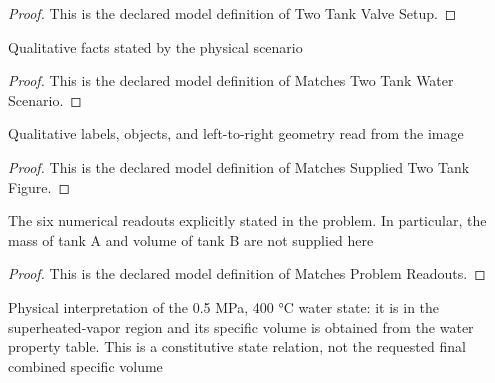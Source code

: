 \begin{proof}
  This is the declared model definition of Two Tank Valve Setup.
\end{proof}
\begin{definition}
  \label{def:physics:phyx-mini-0397:phyxminiproblems-problemphyxmini0397-matchestwotankwaterscenario}
  Qualitative facts stated by the physical scenario
\end{definition}
\begin{proof}
  This is the declared model definition of Matches Two Tank Water Scenario.
\end{proof}
\begin{definition}
  \label{def:physics:phyx-mini-0397:phyxminiproblems-problemphyxmini0397-matchessuppliedtwotankfigure}
  Qualitative labels, objects, and left-to-right geometry read from the image
\end{definition}
\begin{proof}
  This is the declared model definition of Matches Supplied Two Tank Figure.
\end{proof}
\begin{definition}
  \label{def:physics:phyx-mini-0397:phyxminiproblems-problemphyxmini0397-matchesproblemreadouts}
  The six numerical readouts explicitly stated in the problem. In particular, the mass of tank A and volume of tank B are not supplied here
\end{definition}
\begin{proof}
  This is the declared model definition of Matches Problem Readouts.
\end{proof}
\begin{definition}
  \label{def:physics:phyx-mini-0397:phyxminiproblems-problemphyxmini0397-satisfiestankbwaterpropertymodel}
  Physical interpretation of the 0.5 MPa, 400 °C water state: it is in the superheated-vapor region and its specific volume is obtained from the water property table. This is a constitutive state relation, not the requested final combined specific volume
\end{definition}
